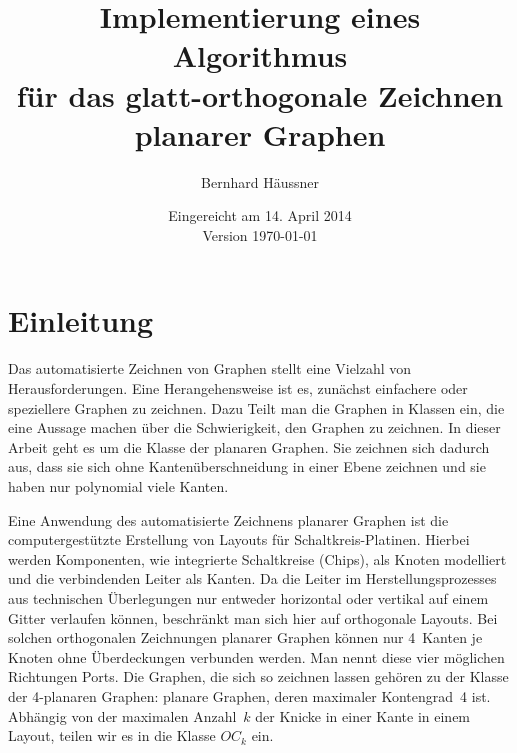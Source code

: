 \documentclass[a4paper]{scrreprt}
\theoremstyle{definition}
\begin{document}


\subject{Bachelorarbeit}
\title{Implementierung eines Algorithmus\\ für das glatt-orthogonale Zeichnen \\ planarer Graphen} %
\author{Bernhard Häussner} %
\date{Eingereicht am 14. April 2014 \\ Version \today} %
\titlehead{Julius-Maximilians-Universität Würzburg\\
Institut für Informatik\\
Lehrstuhl für Informatik I\\
Effiziente Algorithmen und wissensbasierte Systeme}
\publishers{Betreuer:\\
Prof.\ Dr.\ Alexander Wolff\\
Dipl.-Inf.\ Philipp Kindermann} %
\maketitle
\tableofcontents





\chapter{Einleitung}


Das automatisierte Zeichnen von Graphen stellt eine Vielzahl von Herausforderungen. 
Eine Herangehensweise ist es, zunächst einfachere oder speziellere Graphen zu zeichnen. 
Dazu Teilt man die Graphen in Klassen ein, die eine Aussage machen über die Schwierigkeit, den Graphen zu zeichnen. 
In dieser Arbeit geht es um die Klasse der planaren Graphen. Sie zeichnen sich dadurch aus, dass sie sich ohne Kantenüberschneidung in einer Ebene zeichnen und sie haben nur polynomial viele Kanten. 

Eine Anwendung des  automatisierte Zeichnens planarer Graphen ist die computergestützte Erstellung von Layouts für Schaltkreis-Platinen. Hierbei werden Komponenten, wie integrierte Schaltkreise (Chips), als Knoten modelliert und die verbindenden Leiter als Kanten. Da die Leiter im Herstellungsprozesses  aus technischen Überlegungen nur entweder horizontal oder vertikal auf einem Gitter verlaufen können, beschränkt man sich hier auf orthogonale Layouts. Bei solchen orthogonalen Zeichnungen planarer Graphen können nur 4~Kanten je Knoten ohne Überdeckungen verbunden werden. Man nennt diese vier möglichen Richtungen Ports. Die Graphen, die sich so zeichnen lassen gehören zu der Klasse der 4-planaren Graphen: planare Graphen, deren maximaler Kontengrad~4 ist. Abhängig von der maximalen Anzahl~$k$ der Knicke in einer Kante in einem Layout, teilen wir es in die Klasse $OC_k$ ein. %
\end{document}
